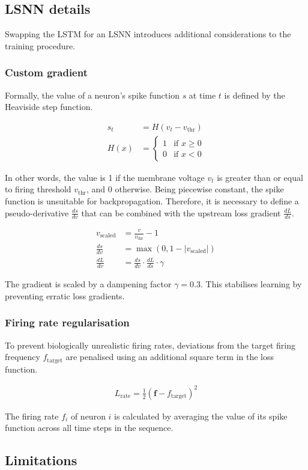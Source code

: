 \documentclass[../../report.tex]{subfiles}
\begin{document}
\subsection{LSNN details}

Swapping the LSTM for an LSNN introduces additional considerations to the
training procedure.

\subsubsection{Custom gradient}
Formally, the value of a neuron's spike function \(s\) at time \(t\) is defined
by the Heaviside step function.

\begin{align}
  s_t &= H(v_t - v_\mathrm{thr})
  \\
  H(x) &=
  \begin{cases}
  1 & \text{if } x \geq 0 \\
  0 & \text{if } x < 0
  \end{cases}
\end{align}

In other words, the value is 1 if the membrane voltage \(v_t\) is greater than
or equal to firing threshold \(v_\mathrm{thr}\), and 0 otherwise. Being
piecewise constant, the spike function is unsuitable for backpropagation.
Therefore, it is necessary to define a pseudo-derivative \(\frac{ds}{dv}\) that
can be combined with the upstream loss gradient \(\frac{dL}{ds}\).

\begin{align}
  v_\mathrm{scaled} &= \frac{v}{v_\mathrm{thr}} - 1
  \\
  \frac{ds}{dv} &= \max(0, 1 - \left| v_\mathrm{scaled} \right|)
  \\
  \frac{dL}{dv} &= \frac{ds}{dv} \cdot \frac{dL}{ds} \cdot \gamma
\end{align}

The gradient is scaled by a dampening factor \(\gamma = 0.3\). This stabilises
learning by preventing erratic loss gradients.


\subsubsection{Firing rate regularisation}

To prevent biologically unrealistic firing rates, deviations from the target
firing frequency \(f_\mathrm{target}\) are penalised using an additional square
term in the loss function.

\begin{align}
  L_\mathrm{rate} = \frac{1}{2} (\bm{f} - f_\mathrm{target})^2
\end{align}

The firing rate \(f_i\) of neuron \(i\) is calculated by averaging the value of
its spike function across all time steps in the sequence.

\subsection{Limitations}
\end{document}
